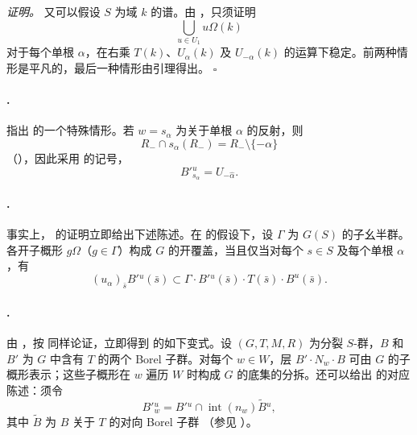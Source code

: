 \textit{证明。}
又可以假设 \(S\) 为域 \(k\) 的谱。由 ，只须证明
\[
  \bigcup_{u\in U_1}u\Omega(k)
\]
对于每个单根 \(\alpha\)，在右乘 \(T(k)\)、\(U_\alpha(k)\) 及 \(U_{-\alpha}(k)\) 的运算下稳定。前两种情形是平凡的，最后一种情形由引理得出。
\hfill\(\square\)

\paragraph{.}
指出  的一个特殊情形。若 \(w=s_\alpha\) 为关于单根 \(\alpha\) 的反射，则
\[
  R_-\cap s_\alpha(R_-)=R_-\setminus\{-\alpha\}
\]
\textup{（）}，因此采用  的记号，
\[
  B'{}^u_{s_\alpha}=U_{-\widehat\alpha}.
\]

\paragraph{.}
事实上， 的证明立即给出下述陈述。在  的假设下，设 \(\Gamma\) 为 \(G(S)\) 的子幺半群。各开子概形 \(g\Omega\)（\(g\in\Gamma\)）构成 \(G\) 的开覆盖，当且仅当对每个 \(s\in S\) 及每个单根 \(\alpha\)，有
\[
  (u_\alpha)_{\bar{s}}B'{}^u(\bar{s})
  \subset
  \Gamma\cdot B'{}^u(\bar{s})\cdot T(\bar{s})\cdot B^u(\bar{s}).
\]

\paragraph{.}
由  \textup{}，按  同样论证，立即得到  的如下变式。设 \((G,T,M,R)\) 为分裂 \(S\)-群，\(B\) 和 \(B'\) 为 \(G\) 中含有 \(T\) 的两个 Borel 子群。对每个 \(w\in W\)，层 \(B'\cdot N_w\cdot B\) 可由 \(G\) 的子概形表示；这些子概形在 \(w\) 遍历 \(W\) 时构成 \(G\) 的底集的分拆。还可以给出  \textup{} 的对应陈述：须令
\[
  B'{}^u_w
  =
  B'{}^u\cap\operatorname{int}(n_w)\widetilde B{}^u,
\]
其中 \(\widetilde B\) 为 \(B\) 关于 \(T\) 的对向 Borel 子群 \textup{（参见 ）}。


